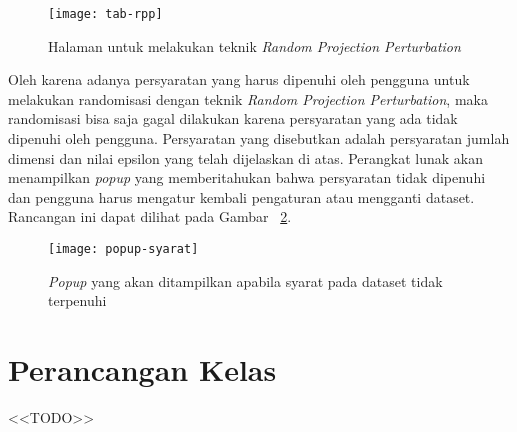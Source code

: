 \begin{figure}
	\centering
	\texttt{[image: tab-rpp]}
	\caption{Halaman untuk melakukan teknik \textit{Random Projection Perturbation}}
	\label{fig:tab-rpp}
\end{figure}

Oleh karena adanya persyaratan yang harus dipenuhi oleh pengguna untuk melakukan randomisasi dengan teknik \textit{Random Projection Perturbation}, maka randomisasi bisa saja gagal dilakukan karena persyaratan yang ada tidak dipenuhi oleh pengguna. Persyaratan yang disebutkan adalah persyaratan jumlah dimensi dan nilai epsilon yang telah dijelaskan di atas. Perangkat lunak akan menampilkan \textit{popup} yang memberitahukan bahwa persyaratan tidak dipenuhi dan pengguna harus mengatur kembali pengaturan atau mengganti dataset. Rancangan ini dapat dilihat pada Gambar ~\ref{fig:popup-syarat}.

\begin{figure}
	\centering
	\texttt{[image: popup-syarat]}
	\caption{\textit{Popup} yang akan ditampilkan apabila syarat pada dataset tidak terpenuhi}
	\label{fig:popup-syarat}
\end{figure}

\section{Perancangan Kelas}
\label{sec:kelas}

<<TODO>>
